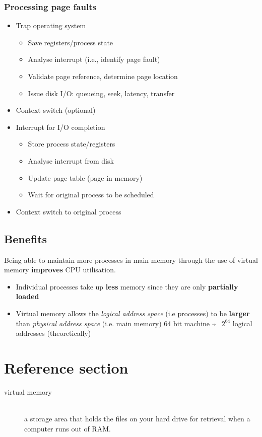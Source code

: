\documentclass{article}
\begin{document}
\subsubsection{Processing page faults}
\begin{itemize}
	\item Trap operating system
	\begin{itemize}
		\item Save registers/process state
		\item Analyse interrupt (i.e., identify page fault)
		\item Validate page reference, determine page location
		\item Issue disk I/O: queueing, seek, latency, transfer
	\end{itemize}
	\item Context switch (optional)
	\item Interrupt for I/O completion
	\begin{itemize}
		\item Store process state/registers
		\item Analyse interrupt from disk
		\item Update page table (page in memory)
		\item Wait for original process to be scheduled
	\end{itemize}
	\item Context switch to original process
\end{itemize}

\subsection{Benefits}
\begin{flushleft}
Being able to maintain more processes in main memory through the use of virtual memory \textbf{improves} CPU utilisation.
\begin{itemize}
	\item Individual processes take up \textbf{less} memory since they are only \textbf{partially loaded}
	\item Virtual memory allows the \textit{logical address space} (i.e processes) to be \textbf{larger} than \textit{physical address space} (i.e. main memory) 64 bit machine \verb!⇒ ! $2^{64}$ logical addresses (theoretically)
\end{itemize}
\end{flushleft}

\pagebreak
\section*{Reference section} \label{sec:reference}
\begin{description}
	\item[virtual memory] \hfill \\ a storage area that holds the files on your hard drive for retrieval when a computer runs out of RAM.
\end{description}
\end{document}
